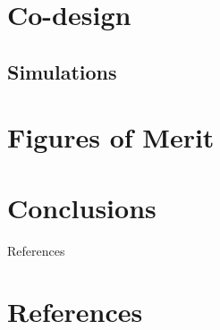 \documentclass{beamer}
\begin{document}
 \section{Co-design}
 \subsection{Simulations}
 \section{Figures of Merit}
 \section{Conclusions}
 \begin{frame}{References}
  \section{References}
  \nocite{*}
  
  
 \end{frame}
\end{document}
